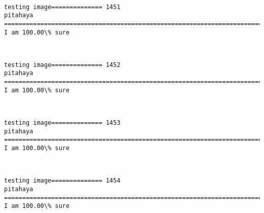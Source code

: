 \documentclass[11pt]{article}
\begin{document}
    \begin{center}
    \end{center}
    { \hspace*{\fill} \\}
    
    \begin{Verbatim}[commandchars=\\\{\}]
testing image============== 1451
pitahaya
============================================================================
I am 100.00\% sure

    \end{Verbatim}

    \begin{center}
    \end{center}
    { \hspace*{\fill} \\}
    
    \begin{Verbatim}[commandchars=\\\{\}]
testing image============== 1452
pitahaya
============================================================================
I am 100.00\% sure

    \end{Verbatim}

    \begin{center}
    \end{center}
    { \hspace*{\fill} \\}
    
    \begin{Verbatim}[commandchars=\\\{\}]
testing image============== 1453
pitahaya
============================================================================
I am 100.00\% sure

    \end{Verbatim}

    \begin{center}
    \end{center}
    { \hspace*{\fill} \\}
    
    \begin{Verbatim}[commandchars=\\\{\}]
testing image============== 1454
pitahaya
============================================================================
I am 100.00\% sure

    \end{Verbatim}
\end{document}
